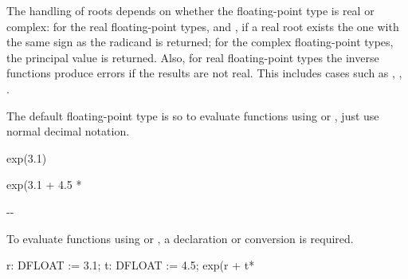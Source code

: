 {{{{{{{{{{{The handling of roots depends on whether the floating-point type
is real or complex: for the real floating-point types,
 and , if a real root exists
the one with the same sign as the radicand is returned; for the
complex floating-point types, the principal value is returned.
Also, for real floating-point types the inverse functions
produce errors if the results are not real.
This includes cases such as , ,
.
%
\begin{xtc}
\begin{xtccomment}
The default floating-point type is  so to evaluate
functions using  or , just use
normal decimal notation.
\end{xtccomment}
\begin{spadsrc}
exp(3.1)
\end{spadsrc}
\begin{TeXOutput}
\begin{fricasmath}{1}
%
\end{fricasmath}
\end{TeXOutput}
\end{xtc}
\begin{xtc}
\begin{xtccomment}
\end{xtccomment}
\begin{spadsrc}
exp(3.1 + 4.5 * %
\end{spadsrc}
\begin{TeXOutput}
\begin{fricasmath}{2}
-{}-{\TIMES %
\ImaginaryI }%
\end{fricasmath}
\end{TeXOutput}
\end{xtc}
\begin{xtc}
\begin{xtccomment}
To evaluate functions using 
or ,
a declaration or conversion is required.
\end{xtccomment}
\begin{spadsrc}
r: DFLOAT := 3.1; t: DFLOAT := 4.5; exp(r + t*%
\end{spadsrc}
\begin{TeXOutput}
\begin{fricasmath}{3}

\end{fricasmath}
\end{TeXOutput}
\end{xtc}}}}}}}}}}}}

